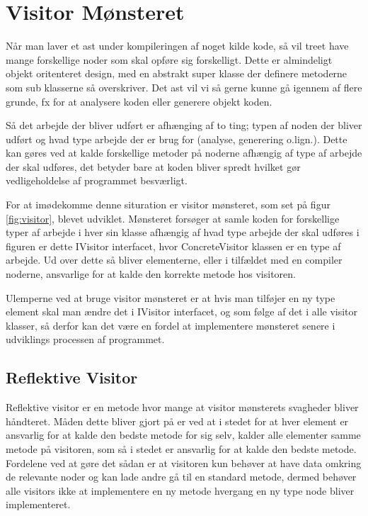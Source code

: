 \section{Visitor Mønsteret}\label{sec:visitor}


Når man laver et \gls{ast} under kompileringen af noget kilde kode, så vil treet have mange forskellige noder som skal opføre sig forskelligt. Dette er almindeligt objekt oritenteret design, med en abstrakt super klasse der definere metoderne som sub klasserne så overskriver. Det \gls{ast} vil vi så gerne kunne gå igennem af flere grunde, fx for at analysere koden eller generere objekt koden. 

Så det arbejde der bliver udført er afhænging af to ting; typen af noden der bliver udført og hvad type arbejde der er brug for (analyse, generering o.lign.). Dette kan gøres ved at kalde forskellige metoder på noderne afhængig af type af arbejde der skal udføres, det betyder bare at koden bliver spredt hvilket gør vedligeholdelse af programmet besværligt.


\noindent For at imødekomme denne situration er visitor mønsteret, som set på figur \ref{fig:visitor}, blevet udviklet. Mønsteret forsøger at samle koden for forskellige typer af arbejde i hver sin klasse afhængig af hvad type arbejde der skal udføres i figuren er dette IVisitor interfacet, hvor ConcreteVisitor klassen er en type af arbejde. Ud over dette så bliver elementerne, eller i tilfældet med en compiler noderne, ansvarlige for at kalde den korrekte metode hos visitoren.

Ulemperne ved at bruge visitor mønsteret er at hvis man tilføjer en ny type element skal man ændre det i IVisitor interfacet, og som følge af det i alle visitor klasser, så derfor kan det være en fordel at implementere mønsteret senere i udviklings processen af programmet.

\subsection{Reflektive Visitor}\label{ssec:refvisitor}

Reflektive visitor er en metode hvor mange at visitor mønsterets svagheder bliver håndteret. Måden dette bliver gjort på er ved at i stedet for at hver element er ansvarlig for at kalde den bedste metode for sig selv, kalder alle elementer samme metode på visitoren, som så i stedet er ansvarlig for at kalde den bedste metode. Fordelene ved at gøre det sådan er at visitoren kun behøver at have data omkring de relevante noder og kan lade andre gå til en standard metode, dermed behøver alle visitors ikke at implementere en ny metode hvergang en ny type node bliver implementeret.
